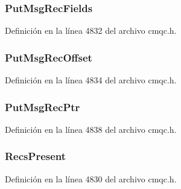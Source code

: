 \subsubsection[{Put\+Msg\+Rec\+Fields}]{ Put\+Msg\+Rec\+Fields}\label{structtag_m_q_p_m_o_aea1b77e1a6f2b6f18526055315f8b175}


Definición en la línea 4832 del archivo cmqc.\+h.

\hypertarget{structtag_m_q_p_m_o_a49f55d9686cdc9c051e09950fede2098}{}
\subsubsection[{Put\+Msg\+Rec\+Offset}]{ Put\+Msg\+Rec\+Offset}\label{structtag_m_q_p_m_o_a49f55d9686cdc9c051e09950fede2098}


Definición en la línea 4834 del archivo cmqc.\+h.

\hypertarget{structtag_m_q_p_m_o_a6721429432b0d4229bdc5477777f0937}{}
\subsubsection[{Put\+Msg\+Rec\+Ptr}]{ Put\+Msg\+Rec\+Ptr}\label{structtag_m_q_p_m_o_a6721429432b0d4229bdc5477777f0937}


Definición en la línea 4838 del archivo cmqc.\+h.

\hypertarget{structtag_m_q_p_m_o_a7592da03e0f1c9bc79c9dd4e641dcf73}{}
\subsubsection[{Recs\+Present}]{ Recs\+Present}\label{structtag_m_q_p_m_o_a7592da03e0f1c9bc79c9dd4e641dcf73}


Definición en la línea 4830 del archivo cmqc.\+h.


